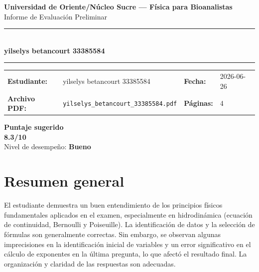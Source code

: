 \documentclass[11pt,a4paper]{article}
\begin{document}
\begin{center}
  {\Large\bfseries\color{azulTitulo} Universidad de Oriente/Núcleo Sucre --- Física para Bioanalistas}\\[4pt]
  {\large Informe de Evaluación Preliminar}\\[12pt]
  \rule{\linewidth}{1.2pt}\\[6pt]
  {\LARGE\bfseries yilselys betancourt 33385584}\\[4pt]
  \rule{\linewidth}{0.6pt}
\end{center}

\vspace{4pt}
\begin{tcolorbox}[cajaTitulo, title=Datos del informe]
\begin{tabular}{@{}llll@{}}
  \textbf{Estudiante:}  & yilselys betancourt 33385584  &
  \textbf{Fecha:}       & 2026-06-26 \\[4pt]
  \textbf{Archivo PDF:} & \texttt{yilselys\_betancourt\_33385584.pdf}  &
  \textbf{Páginas:}     & 4 \\
\end{tabular}
\end{tcolorbox}

\vspace{6pt}
\begin{center}
  \begin{tcolorbox}[
    enhanced,
    colback=white, colframe=desempeno_bueno,
    width=0.62\linewidth,
    boxrule=2pt,
    halign=center, valign=center,
    top=8pt, bottom=8pt,
  ]
    \centering
    {\large\bfseries Puntaje sugerido}\\[6pt]
    {\Huge\bfseries\color{desempeno_bueno} 8.3/10}\\[6pt]
    {\large Nivel de desempeño: \textbf{\color{desempeno_bueno} Bueno}}
  \end{tcolorbox}
\end{center}

\section*{Resumen general}
El estudiante demuestra un buen entendimiento de los principios físicos fundamentales aplicados en el examen, especialmente en hidrodinámica (ecuación de continuidad, Bernoulli y Poiseuille). La identificación de datos y la selección de fórmulas son generalmente correctas. Sin embargo, se observan algunas imprecisiones en la identificación inicial de variables y un error significativo en el cálculo de exponentes en la última pregunta, lo que afectó el resultado final. La organización y claridad de las respuestas son adecuadas.
\end{document}
